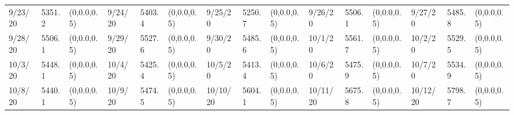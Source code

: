 \documentclass[12pt]{article}
\begin{document}
\begin{table}
\begin{center}
\begin{tabular}{p{15pt}p{15pt}p{25pt}p{15pt}p{15pt}p{25pt}p{15pt}p{15pt}p{25pt}p{15pt}p{15pt}p{25pt}p{15pt}p{15pt}p{25pt}}
            9/23/20&5351.2&(0,0.0,0.5)&9/24/20&5403.4&(0,0.0,0.5)&9/25/20&5250.7&(0,0.0,0.5)&9/26/20&5506.1&(0,0.0,0.5)&9/27/20&5485.8&(0,0.0,0.5)\\
            9/28/20&5506.1&(0,0.0,0.5)&9/29/20&5527.6&(0,0.0,0.5)&9/30/20&5485.6&(0,0.0,0.5)&10/1/20&5561.7&(0,0.0,0.5)&10/2/20&5529.5&(0,0.0,0.5)\\
            10/3/20&5448.1&(0,0.0,0.5)&10/4/20&5425.4&(0,0.0,0.5)&10/5/20&5413.4&(0,0.0,0.5)&10/6/20&5475.9&(0,0.0,0.5)&10/7/20&5534.9&(0,0.0,0.5)\\
            10/8/20&5440.1&(0,0.0,0.5)&10/9/20&5474.5&(0,0.0,0.5)&10/10/20&5604.1&(0,0.0,0.5)&10/11/20&5675.8&(0,0.0,0.5)&10/12/20&5798.7&(0,0.0,0.5)\\
            \bottomrule 
            \end{tabular}
            \end{center}
            \end{table}
\end{document}
